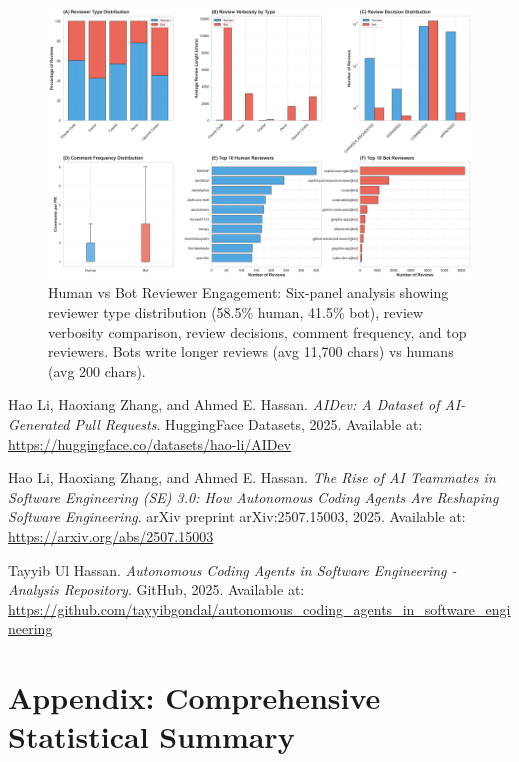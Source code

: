 \documentclass[11pt]{article}
\begin{document}
\begin{figure}[H]
\centering
\includegraphics[width=\textwidth]{figures/fig5_human_vs_bot_engagement.png}
\caption{Human vs Bot Reviewer Engagement: Six-panel analysis showing reviewer type distribution (58.5\% human, 41.5\% bot), review verbosity comparison, review decisions, comment frequency, and top reviewers. Bots write longer reviews (avg 11,700 chars) vs humans (avg 200 chars).}
\label{fig:human_bot}
\end{figure}

\newpage
\begin{thebibliography}{9}

Hao Li, Haoxiang Zhang, and Ahmed E. Hassan.
\textit{AIDev: A Dataset of AI-Generated Pull Requests}.
HuggingFace Datasets, 2025.
Available at: \url{https://huggingface.co/datasets/hao-li/AIDev}

Hao Li, Haoxiang Zhang, and Ahmed E. Hassan.
\textit{The Rise of AI Teammates in Software Engineering (SE) 3.0: How Autonomous Coding Agents Are Reshaping Software Engineering}.
arXiv preprint arXiv:2507.15003, 2025.
Available at: \url{https://arxiv.org/abs/2507.15003}

Tayyib Ul Hassan.
\textit{Autonomous Coding Agents in Software Engineering - Analysis Repository}.
GitHub, 2025.
Available at: \url{https://github.com/tayyibgondal/autonomous_coding_agents_in_software_engineering}

\end{thebibliography}

\newpage
\section*{Appendix: Comprehensive Statistical Summary}
\label{sec:appendix}
\end{document}
